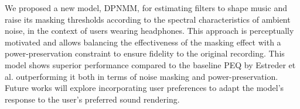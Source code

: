 We proposed a new model, DPNMM, for estimating filters to shape music and raise its masking thresholds according to the spectral characteristics of ambient noise, in the context of users wearing headphones. This approach is perceptually motivated and allows balancing the effectiveness of the masking effect with a power-preservation constraint to ensure fidelity to the original recording.
This model shows superior performance compared to the baseline PEQ by Estreder et al. \cite{estrederPerceptualAudioEqualization2018} outperforming it both in terms of noise masking and power-preservation. 
Future works will explore incorporating user preferences to adapt the model's response to the user's preferred sound rendering.